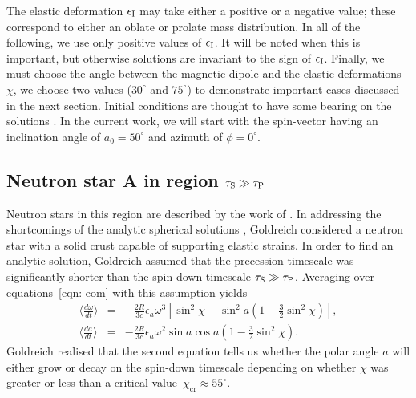 \documentclass[../full_thesis/full_thesis.tex]{subfiles}
\begin{document}
The elastic deformation $\epsilon_{\mathrm{I}}$ may take either a positive or a negative
value; these correspond to either an oblate or prolate mass distribution.  In
all of the following, we use only positive values of $\epsilon_{\mathrm{I}}$. It will be noted
when this is important, but otherwise solutions are invariant to the sign of
$\epsilon_{\mathrm{I}}$. Finally, we must choose the angle between the magnetic dipole and the
elastic deformations $\chi$, we choose two values ($30^\circ$ and $75^\circ$)
to demonstrate important cases discussed in the next section. Initial
conditions are thought to have some bearing on the solutions
\citep[see][]{Melatos2000}. In the current work, we will start with the
spin-vector having an inclination angle of $a_0=50^{\circ}$ and azimuth of
$\phi=0^{\circ}$.


\subsection{Neutron star A in region \texorpdfstring{$\tau_{\mathrm{S}}\gg \tau_{\mathrm{P}}$}{}}
\label{sec: A_NA}
Neutron stars in this region are described by the work of \citet{Goldreich1970}. In
addressing the shortcomings of the analytic spherical solutions
\citep{Davis1970, Michel1970}, Goldreich considered a neutron star with a solid
crust capable of supporting elastic strains. In order to find an analytic
solution, Goldreich assumed that the precession timescale was significantly
shorter than the spin-down timescale $\tau_{\mathrm{S}} \gg \tau_{\mathrm{P}}$. Averaging
over equations~\eqref{eqn: eom} with this assumption yields
\begin{eqnarray}
\Big\langle \frac{d \omega}{dt}\Big\rangle & = & -\frac{2R}{3c}\epsilon_{a}\omega^{3}\left[ \sin^{2} \chi +\sin^{2}a \left(1-\frac{3}{2}\sin^{2}\chi\right)\right], \\
\Big\langle \frac{d a}{dt}\Big\rangle & = & -\frac{2R}{3c}\epsilon_{a}\omega^{2}\sin a \cos a \left(1-\frac{3}{2}\sin^{2}\chi\right).
\label{eqn: goldreich_averaged_eqns}
\end{eqnarray}
Goldreich realised that the second equation tells us whether the polar angle $a$ will
either grow or decay on the spin-down timescale depending on whether $\chi$ was
greater or less than a critical value~$\chi_{\mathrm{\textrm{cr}}} \approx 55^{\circ}$.
\end{document}
